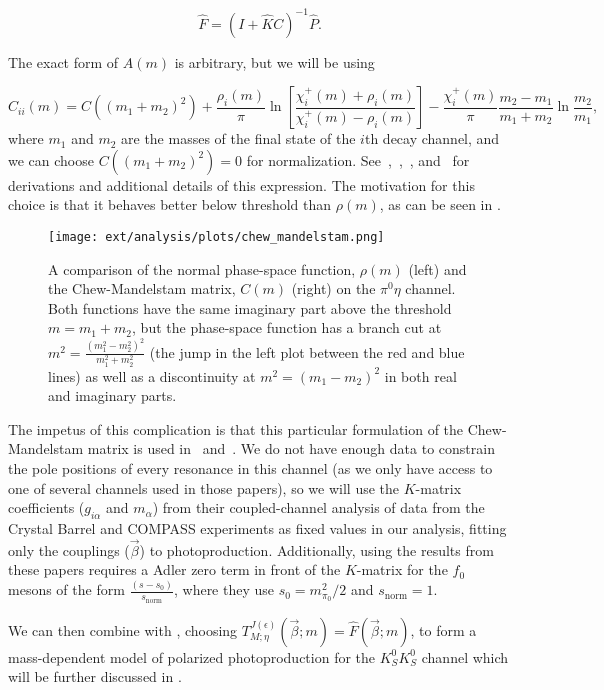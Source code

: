 \begin{equation}
  \hat{F} = (I + \hat{K}C)^{-1}\hat{P}.
  \label{eq:k-matrix-production-amplitude-chew}
\end{equation}

The exact form of $A(m)$ is arbitrary, but we will be using

\begin{equation}
  C_{ii}(m) = C((m_1 + m_2)^2) + \frac{\rho_i(m)}{\pi}\ln\left[\frac{\chi^+_i(m) + \rho_i(m)}{\chi^+_i(m) - \rho_i(m)}\right] - \frac{\chi^+_i(m)}{\pi}\frac{m_2 - m_1}{m_1 + m_2}\ln\frac{m_2}{m_1},
  \label{eq:chew-mandelstam}
\end{equation}
where $m_1$ and $m_2$ are the masses of the final state of the $i$th decay channel, and we can choose $C((m_1 + m_2)^2) = 0$ for normalization. See~\cite{Oller1999},~\cite{Basdevant1977},~\cite{Oller2001}, and~\cite{Reid1984} for derivations and additional details of this expression. The motivation for this choice is that it behaves better below threshold than $\rho(m)$, as can be seen in .

\begin{figure}
  \begin{center}
    \texttt{[image: ext/analysis/plots/chew\_mandelstam.png]}
  \end{center}
  \caption{A comparison of the normal phase-space function, $\rho(m)$ (left) and the Chew-Mandelstam matrix, $C(m)$ (right) on the $\pi^0\eta$ channel. Both functions have the same imaginary part above the threshold $m = m_1 + m_2$, but the phase-space function has a branch cut at $m^2 = \frac{(m_1^2 - m_2^2)^2}{m_1^2 + m_2^2}$ (the jump in the left plot between the red and blue lines) as well as a discontinuity at $m^2 = (m_1 - m_2)^2$ in both real and imaginary parts.}\label{fig:chew-mandelstam}
\end{figure}


The impetus of this complication is that this particular formulation of the Chew-Mandelstam matrix is used in~\cite{Albrecht2020} and~\cite{Kopf2021}. We do not have enough data to constrain the pole positions of every resonance in this channel (as we only have access to one of several channels used in those papers), so we will use the $K$-matrix coefficients ($g_{i\alpha}$ and $m_\alpha$) from their coupled-channel analysis of data from the Crystal Barrel and COMPASS experiments as fixed values in our analysis, fitting only the couplings ($\vec{\beta}$) to photoproduction. Additionally, using the results from these papers requires a Adler zero term in front of the $K$-matrix for the $f_0$ mesons of the form $\frac{(s - s_0)}{s_\text{norm}}$, where they use $s_0 = m^2_{\pi_0}/2$ and $s_\text{norm} = 1$.

We can then combine  with , choosing $T^{J(\epsilon)}_{M;\eta}(\vec{\beta}; m) = \hat{F}(\vec{\beta}; m)$, to form a mass-dependent model of polarized photoproduction for the $K_S^0K_S^0$ channel which will be further discussed in .
